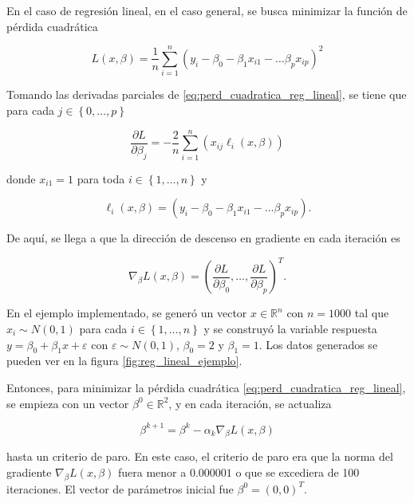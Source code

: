En el caso de regresión lineal, en el caso general, se busca minimizar la función de pérdida cuadrática

\begin{equation}
  \label{eq:perd_cuadratica_reg_lineal}
  L(x, \beta) = \frac{1}{n} \sum_{i = 1}^n \left( y_i - \beta_0 - \beta_1 x_{i1} - \hdots  \beta_p x_{ip} \right)^2
\end{equation}

Tomando las derivadas parciales de \ref{eq:perd_cuadratica_reg_lineal}, se tiene que para cada $j \in \left\{0, \hdots, p \right\}$

\begin{equation}
  \frac{\partial L}{\partial \beta_j} = 
    -\frac{2}{n} \sum_{i = 1}^n \left( x_{ij} \ell_i(x, \beta) \right)
\end{equation}

donde $x_{i1} = 1$ para toda $i \in \left\{1, \hdots, n \right\}$ y

\begin{equation}
  \label{eq:ele_i_reg_lineal}
  \ell_i(x, \beta) = \left( y_i - \beta_0 - \beta_1 x_{i1} - \hdots  \beta_p x_{ip} \right).
\end{equation}

De aquí, se llega a que la dirección de descenso en gradiente en cada iteración es

$$
  \nabla_{\beta} L(x, \beta) = \left( \frac{\partial L}{\partial \beta_0}, \hdots, \frac{\partial L}{\partial \beta_p} \right)^T.
$$

En el ejemplo implementado, se generó un vector $x \in \mathbb{R}^n$ con $n = 1000$ tal que $x_i \sim N(0, 1)$ para cada $i \in \left\{1, \hdots, n \right\}$ y se construyó la variable respuesta $y = \beta_0 + \beta_1x + \varepsilon$ con $\varepsilon \sim N(0, 1)$, $\beta_0 = 2$ y $\beta_1 = 1$. Los datos generados se pueden ver en la figura \ref{fig:reg_lineal_ejemplo}.

Entonces, para minimizar la pérdida cuadrática \ref{eq:perd_cuadratica_reg_lineal}, se empieza con un vector $\beta^0 \in \mathbb{R}^2$, y en cada iteración, se actualiza 

$$
  \beta^{k+1} = \beta^k - \alpha_k \nabla_{\beta} L(x, \beta)
$$

hasta un criterio de paro. En este caso, el criterio de paro era que la norma del gradiente $\nabla_{\beta} L(x, \beta)$ fuera menor a $0.000001$ o que se excediera de 100 iteraciones. El vector de parámetros inicial fue $\beta^0 = (0, 0)^T$. 

